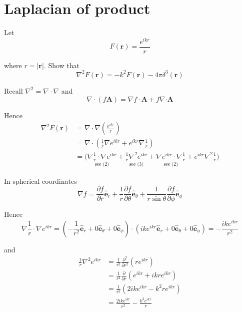 


\section*{Laplacian of product}

Let 
\begin{equation*}
F(\mathbf r)=\frac{e^{ikr}}{r}
\end{equation*}

where $r=|\mathbf r|$.
Show that
\begin{equation*}
\nabla^2F(\mathbf r)=-k^2F(\mathbf r)-4\pi\delta^3(\mathbf r)
\end{equation*}

Recall $\nabla^2=\nabla\cdot\nabla$ and
\begin{equation*}
\nabla\cdot(f\mathbf A)=\nabla f\cdot\mathbf A+f\nabla\mathbf\cdot\mathbf A
\end{equation*}

Hence
\begin{align*}
\nabla^2F(\mathbf r)
&=\nabla\cdot\nabla\left(\frac{e^{ikr}}{r}\right)
\\
&=\nabla\cdot\left(\frac{1}{r}\nabla e^{ikr}+e^{ikr}\nabla\frac{1}{r}\right)
\\
&=\biggl(
\underset{\text{see (2)}}{\nabla\frac{1}{r}\cdot\nabla e^{ikr}}
+\underset{\text{see (3)}}{\frac{1}{r}\nabla^2e^{ikr}}
+\underset{\text{see (2)}}{\nabla e^{ikr}\cdot\nabla\frac{1}{r}}
+e^{ikr}\nabla^2\frac{1}{r}
\biggr)\tag{1}
\end{align*}

In spherical coordinates
\begin{equation*}
\nabla f=\frac{\partial f}{\partial r}\hat{\mathbf e}_r
+\frac{1}{r}\frac{\partial f}{\partial\theta}\hat{\mathbf e}_\theta
+\frac{1}{r\sin\theta}\frac{\partial f}{\partial\phi}\hat{\mathbf e}_\phi
\end{equation*}

Hence
\begin{equation*}
\nabla\frac{1}{r}\cdot\nabla e^{ikr}
=\left(-\frac{1}{r^2}\hat{\mathbf e}_r+0\hat{\mathbf e}_\theta+0\hat{\mathbf e}_\phi\right)
\cdot\left(ike^{ikr}\hat{\mathbf e}_r+0\hat{\mathbf e}_\theta+0\hat{\mathbf e}_\phi\right)
=-\frac{ike^{ikr}}{r^2}\tag{2}
\end{equation*}

and
\begin{align*}
\frac{1}{r}\nabla^2e^{ikr}&=\frac{1}{r^2}\frac{\partial^2}{\partial r^2}(re^{ikr})
\\
&=\frac{1}{r^2}\frac{\partial}{\partial r}\left(e^{ikr}+ikre^{ikr}\right)
\\
&=\frac{1}{r^2}\left(2ike^{ikr}-k^2re^{ikr}\right)
\\
&=\frac{2ike^{ikr}}{r^2}-\frac{k^2e^{ikr}}{r}\tag{3}
\end{align*}

